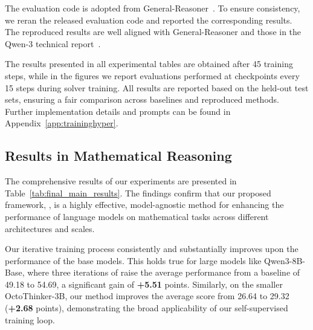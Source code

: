 The evaluation code is adopted from General-Reasoner~\citep{Ma2025GeneralReasonerAL}. To ensure consistency, we reran the released evaluation code and reported the corresponding results. The reproduced results are well aligned with General-Reasoner and those in the Qwen-3 technical report~\citep{Yang2025Qwen3TR}.

The results presented in all experimental tables are obtained after 45 training steps, while in the figures we report evaluations performed at checkpoints every 15 steps during solver training. All results are reported based on the held-out test sets, ensuring a fair comparison across baselines and reproduced methods.
Further implementation details and  prompts  can be found in Appendix~\ref{app:traininghyper}.

\subsection{Results in Mathematical Reasoning}
The comprehensive results of our experiments are presented in Table~\ref{tab:final_main_results}. The findings confirm that our proposed framework, \method{}, is a highly effective, model-agnostic method for enhancing the performance of language models on mathematical tasks across different architectures and scales.




Our iterative training process consistently and substantially improves upon the performance of the base models. This holds true for large models like Qwen3-8B-Base, where three iterations of \method{} raise the average performance from a baseline of 49.18 to 54.69, a significant gain of \textbf{+5.51} points. Similarly, on the smaller OctoThinker-3B, our method improves the average score from 26.64 to 29.32 (\textbf{+2.68} points), demonstrating the broad applicability of our self-supervised training loop.


